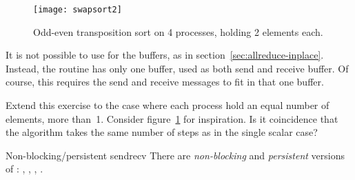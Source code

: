 \begin{figure}[ht]
  \texttt{[image: swapsort2]}
  \caption{Odd-even transposition sort on 4 processes, holding 2 elements each.}
  \label{fig:swapsort2}
\end{figure}

\begin{remark}
  It is not possible to use  for the buffers,
  as in section~\ref{sec:allreduce-inplace}.
  Instead, the routine  has only one buffer,
  used as both send and receive buffer.
  Of course, this requires the send and receive messages
  to fit in that one buffer.
\end{remark}

\begin{exercise}
  Extend this exercise to the case where each process hold an equal
  number of elements, more than~1. Consider figure~\ref{fig:swapsort2}
  for inspiration. Is it coincidence that the algorithm takes the same
  number of steps as in the single scalar case?
\end{exercise}

\begin{mpifournote}{Non-blocking/persistent sendrecv}
  There are
  \emph{non-blocking}
  and
  \emph{persistent}
  versions of :
  , ,
  , .
\end{mpifournote}
